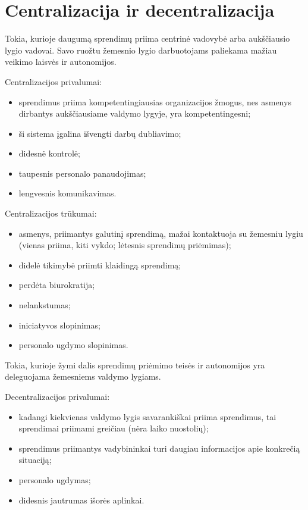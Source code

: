 \section{Centralizacija ir decentralizacija}

\begin{defn}
  Tokia, kurioje daugumą sprendimų priima centrinė vadovybė arba
  aukščiausio lygio vadovai. Savo ruožtu žemesnio lygio darbuotojams
  paliekama mažiau veikimo laisvės ir autonomijos.
\end{defn}

Centralizacijos privalumai:
\begin{itemize}
  \item sprendimus priima kompetentingiausias organizacijos žmogus, nes
    asmenys dirbantys aukščiausiame valdymo lygyje, yra kompetentingesni;
  \item ši sistema įgalina išvengti darbų dubliavimo;
  \item didesnė kontrolė;
  \item taupesnis personalo panaudojimas;
  \item lengvesnis komunikavimas.
\end{itemize}

Centralizacijos trūkumai:
\begin{itemize}
  \item asmenys, priimantys galutinį sprendimą, mažai kontaktuoja su
    žemesniu lygiu (vienas priima, kiti vykdo; lėtesnis sprendimų
    priėmimas);
  \item didelė tikimybė priimti klaidingą sprendimą;
  \item perdėta biurokratija;
  \item nelankstumas;
  \item iniciatyvos slopinimas;
  \item personalo ugdymo slopinimas.
\end{itemize}

\begin{defn}
  Tokia, kurioje žymi dalis sprendimų priėmimo teisės ir autonomijos
  yra deleguojama žemesniems valdymo lygiams.
\end{defn}

Decentralizacijos privalumai:
\begin{itemize}
  \item kadangi kiekvienas valdymo lygis savarankiškai priima sprendimus,
    tai sprendimai priimami greičiau (nėra laiko nuostolių);
  \item sprendimus priimantys vadybininkai turi daugiau informacijos
    apie konkrečią situaciją;
  \item personalo ugdymas;
  \item didesnis jautrumas išorės aplinkai.
\end{itemize}

